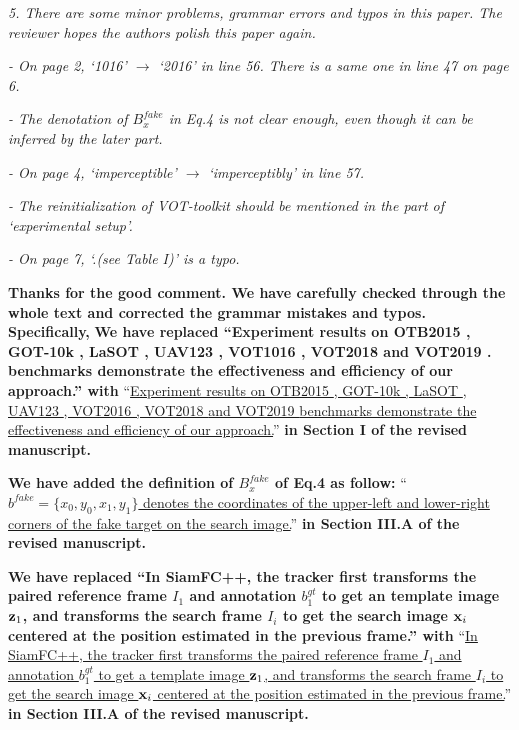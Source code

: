 \documentclass[12pt]{article}
\begin{document}
\textit{
5. There are some minor problems, grammar errors and typos in this paper. The reviewer hopes the authors polish this paper again.}

\textit{- On page 2, ‘1016’ $\rightarrow$ ‘2016’ in line 56. There is a same one in line 47 on page 6.}

\textit{- The denotation of $B_x^{fake}$ in Eq.4 is not clear enough, even though it can be inferred by the later part.}

\textit{- On page 4, ‘imperceptible’ $\rightarrow$ ‘imperceptibly’ in line 57.}

\textit{- The reinitialization of VOT-toolkit should be mentioned in the part of ‘experimental setup’.}

\textit{- On page 7, ‘.(see Table I)’ is a typo.}

\textbf{Thanks for the good comment. We have carefully checked through the whole text and corrected the grammar mistakes and typos. Specifically,}
\textbf{We have replaced ``Experiment results on OTB2015 \cite{OTB}, GOT-10k \cite{GOT-10k}, LaSOT \cite{GOT-10k}, UAV123 \cite{UAV123}, VOT1016 \cite{VOT2016}, VOT2018 \cite{VOT2018} and VOT2019 \cite{VOT2019}. benchmarks demonstrate the effectiveness and efficiency of our approach.'' with}
``\uline{Experiment results on OTB2015 \cite{OTB}, GOT-10k \cite{GOT-10k}, LaSOT \cite{LaSOT}, UAV123 \cite{UAV123}, VOT2016 \cite{VOT2016}, VOT2018 \cite{VOT2018} and VOT2019 \cite{VOT2019} benchmarks demonstrate the effectiveness and efficiency of our approach.}''
\textbf{in Section I of the revised manuscript.}

\textbf{We have added the definition of $B_x^{fake}$ of Eq.4 as follow:}
``\uline{$b^{fake} = \{x_0, y_0, x_1, y_1\}$ denotes the coordinates of the upper-left and lower-right corners of the fake target on the search image.}''
\textbf{in Section III.A of the revised manuscript.}

\textbf{We have replaced ``In SiamFC++, the tracker first transforms the paired reference frame $I_1$ and annotation $b_1^{gt}$ to get an template image $\textbf z_1$, and transforms the search frame $I_i$ to get the search image $\textbf x_i$ centered at the position estimated in the previous frame.'' with}
``\uline{In SiamFC++, the tracker first transforms the paired reference frame $I_1$ and annotation $b_1^{gt}$ to get a template image $\textbf z_1$, and transforms the search frame $I_i$ to get the search image $\textbf x_i$ centered at the position estimated in the previous frame.}''
\textbf{in Section III.A of the revised manuscript.}
\end{document}
